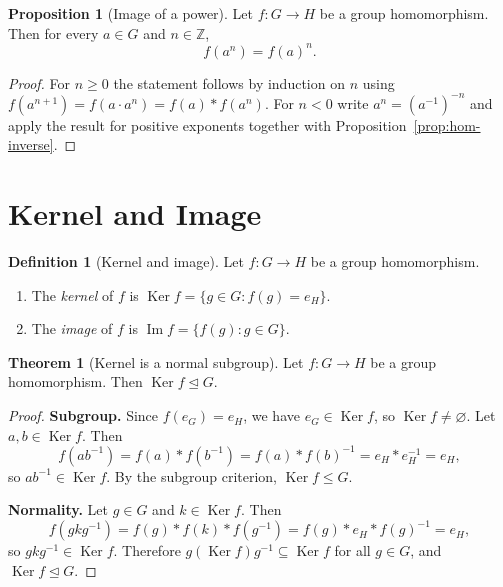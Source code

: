 \documentclass[12pt,a4paper,openany]{book}
\theoremstyle{definition}
\newtheorem{definition}{Definition}[chapter]
\newtheorem{theorem}{Theorem}[chapter]
\newtheorem{proposition}{Proposition}[chapter]
\theoremstyle{remark}
\newcommand{\Z}{\mathbb{Z}}
\DeclareMathOperator{\Ker}{Ker}
\DeclareMathOperator{\im}{Im}
\begin{document}
\begin{proposition}[Image of a power]\label{prop:hom-power}
Let $f\colon G\to H$ be a group homomorphism.  Then for every $a\in G$
and $n\in\Z$,
\[
   f(a^n) = f(a)^n.
\]
\end{proposition}

\begin{proof}
For $n\ge 0$ the statement follows by induction on $n$ using
$f(a^{n+1})=f(a\cdot a^n)=f(a)\ast f(a^n)$.
For $n<0$ write $a^n=(a^{-1})^{-n}$ and apply the result for positive
exponents together with Proposition~\ref{prop:hom-inverse}.
\end{proof}

\section{Kernel and Image}\label{sec:kernel-image}

\begin{definition}[Kernel and image]\label{def:kernel-image}
Let $f\colon G\to H$ be a group homomorphism.
\begin{enumerate}
\item The \emph{kernel} of $f$ is
      $\Ker f = \{g\in G : f(g)=e_H\}$.
\item The \emph{image} of $f$ is
      $\im f = \{f(g) : g\in G\}$.
\end{enumerate}
\end{definition}

\begin{theorem}[Kernel is a normal subgroup]\label{thm:ker-normal}
Let $f\colon G\to H$ be a group homomorphism.
Then $\Ker f \trianglelefteq G$.
\end{theorem}

\begin{proof}
\textbf{Subgroup.}
Since $f(e_G)=e_H$, we have $e_G\in\Ker f$, so $\Ker f\ne\varnothing$.
Let $a,b\in\Ker f$.  Then
\[
   f(ab^{-1}) = f(a)\ast f(b^{-1}) = f(a)\ast f(b)^{-1}
              = e_H \ast e_H^{-1} = e_H,
\]
so $ab^{-1}\in\Ker f$.  By the subgroup criterion, $\Ker f\le G$.

\textbf{Normality.}
Let $g\in G$ and $k\in\Ker f$.  Then
\[
   f(gkg^{-1}) = f(g)\ast f(k)\ast f(g^{-1})
               = f(g)\ast e_H \ast f(g)^{-1} = e_H,
\]
so $gkg^{-1}\in\Ker f$.  Therefore $g(\Ker f)g^{-1}\subseteq\Ker f$
for all $g\in G$, and $\Ker f\trianglelefteq G$.
\end{proof}
\end{document}
